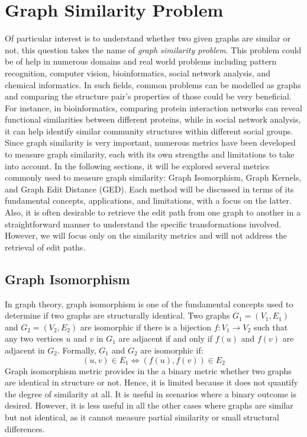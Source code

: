 \documentclass[../Thesis.tex]{subfiles}
\begin{document}
	
	\chapter{Graph Similarity Problem}
	\label{sec:graph_similarity_problem}
	
	Of particular interest is to understand whether two given graphs are similar or not, this question takes the name of \emph{graph similarity problem}. This problem could be of help in numerous domains and real world problems including  pattern recognition, computer vision, bioinformatics, social network analysis, and chemical informatics. In such fields, common problems can be modelled as graphs and comparing the structure pair's properties of those could be very beneficial. For instance, in bioinformatics, comparing protein interaction networks can reveal functional similarities between different proteins, while in social network analysis, it can help identify similar community structures within different social groups. Since graph similarity is very important, numerous metrics have been developed to measure graph similarity, each with its own strengths and limitations to take into account. In the following sections, it will be explored several metrics commonly used to measure graph similarity: Graph Isomorphism, Graph Kernels, and Graph Edit Distance (GED). Each method will be discussed in terms of its fundamental concepts, applications, and limitations, with a focus on the latter. Also, it is often desirable to retrieve the edit path from one graph to another in a straightforward manner to understand the specific transformations involved. However, we will focus only on the similarity metrics and will not address the retrieval of edit paths.
	
	\section{Graph Isomorphism}
	
	In graph theory, graph isomorphism is one of the fundamental concepts used to determine if two graphs are structurally identical. Two graphs $G_1 = (V_1, E_1)$ and $G_2 = (V_2, E_2)$ are isomorphic if there is a bijection $f: V_1 \to V_2$ such that any two vertices $u$ and $v$ in $G_1$ are adjacent if and only if $f(u)$ and $f(v)$ are adjacent in $G_2$. Formally, $G_1$ and $G_2$ are isomorphic if:
	\[
	(u, v) \in E_1 \Leftrightarrow (f(u), f(v)) \in E_2
	\]
	Graph isomorphism metric provides in the a binary metric whether two graphs are identical in structure or not. Hence, it is limited because it does not quantify the degree of similarity at all. It is useful in scenarios where a binary outcome is desired. However, it is less useful in all the other cases where graphs are similar but not identical, as it cannot measure partial similarity or small structural differences.
\end{document}
